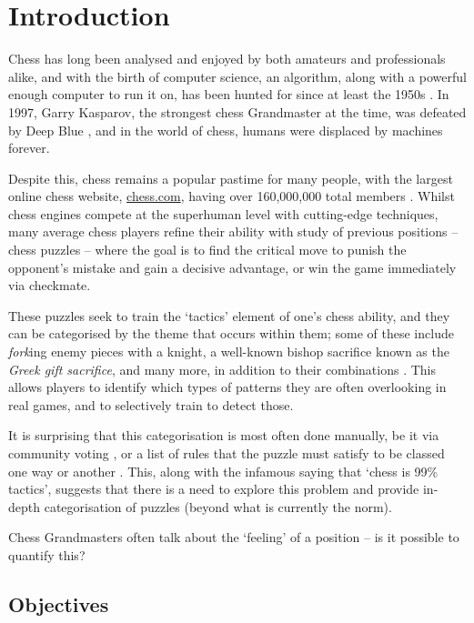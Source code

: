 \chapter{Introduction}

Chess has long been analysed and enjoyed by both amateurs and professionals
alike, and with the birth of computer science, an algorithm, along with a
powerful enough computer to run it on, has been hunted for since at least the
1950s \citep{shannon}. In 1997, Garry Kasparov, the strongest chess Grandmaster
at the time, was defeated by Deep Blue \citep{deepBlue}, and in the world of
chess, humans were displaced by machines forever. 

Despite this, chess remains a popular pastime for many people, with the largest
online chess website, \url{chess.com}, having over 160,000,000 total members
\citep{chesscomMembers}. Whilst chess engines compete at the superhuman level
with cutting-edge techniques, many average chess players refine their ability
with study of previous positions -- chess puzzles -- where the goal is to find
the critical move to punish the opponent's mistake and gain a decisive
advantage, or win the game immediately via checkmate. 

These puzzles seek to train the `tactics' element of one's chess ability, and
they can be categorised by the theme that occurs within them; some of these
include \emph{fork}ing enemy pieces with a knight, a well-known bishop
sacrifice known as the \emph{Greek gift sacrifice}, and many more, in addition
to their combinations \citep{chessPatterns}. This allows players to identify
which types of patterns they are often overlooking in real games, and to
selectively train to detect those. 

It is surprising that this categorisation is most often done manually, be it
via community voting \citep{lichessPuzzles}, or a list of rules that the puzzle
must satisfy to be classed one way or another \citep{lichessTagger}. This,
along with the infamous saying that `chess is 99\% tactics', suggests that
there is a need to explore this problem and provide in-depth categorisation of
puzzles (beyond what is currently the norm).

Chess Grandmasters often talk about the `feeling' of a position -- is it
possible to quantify this?

\section{Objectives}

